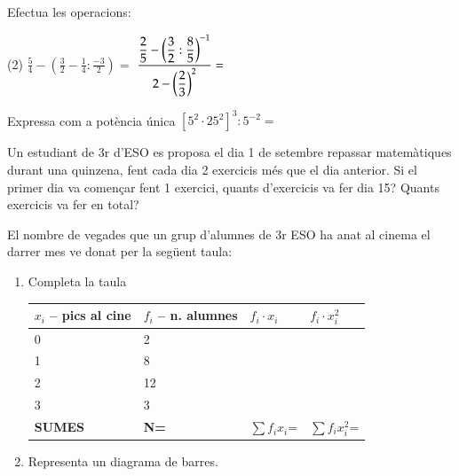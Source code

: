 


\begin{mylist}
 
	
	 \exer[2] Efectua les operacions:
	
	\begin{tasks}(2)
		\task $\frac{5}{4}-\left(\frac{3}{2}-\frac{1}{4}\mathrm{:}\frac{-3}{2}\right)=$ 
		\task $\frac{\ofrac{2}{5}- \left(\ofrac{3}{2}:\ofrac{8}{5}\right)^{-1}}{2-\left(\ofrac{2}{3}\right)^{2}}=$
	\end{tasks}
	
	\exer[2]  Expressa com a potència única ${\left[5^2 \cdot 25^2 \right]}^3 : 5^{-2}=$
 
 	
	 \exer[2] Un estudiant de 3r d'ESO es proposa el dia 1 de setembre repassar matemàtiques durant una quinzena, fent cada dia 2 exercicis més que el dia anterior. Si el primer dia va començar fent 1 exercici, quants d'exercicis va fer dia 15? Quants exercicis va fer en total?
 
 	
	 \exer[2] El nombre de vegades que un grup d'alumnes de 3r ESO ha anat al cinema el darrer mes ve donat  per la següent taula:
	 
	\begin{enumerate}
		\item Completa la taula

	\begin{tabular}{|p{1.2in}|p{1.2in}|p{1.2in}|p{1.2in}|} \hline 
	 \rowcolor{lightgray}	\textbf{ $x_i$ -- pics al cine} & \textbf{$f_i$ -- n. alumnes} & $f_i \cdot x_i$ & $f_i \cdot x_i^2$ \\ \hline 
		0 & 2 &  &   \\ \hline 
		1 & 8 &  &  \\ \hline 
		2 & 12 &  &  \\ \hline 
		3 & 3 &  &  \\ \hline 
		\rowcolor{lightgray} \textbf{SUMES} & \textbf{N=} & $\sum f_i x_i$= & $\sum f_i x_i^2$= \\ \hline 
	\end{tabular}
	
	\item Representa un diagrama de barres. 
	

\end{enumerate}
\end{mylist}
